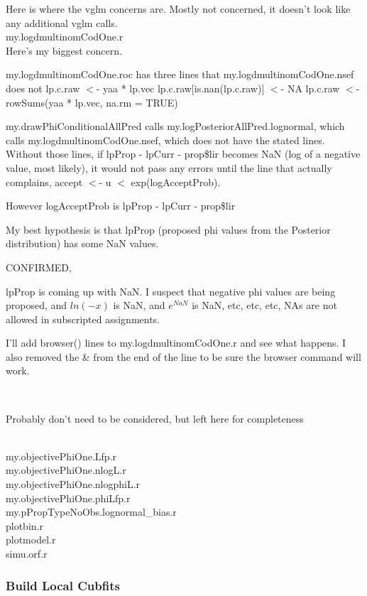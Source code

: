 \documentclass[11pt]{article} %
\begin{document}
Here is where the vglm concerns are. Mostly not concerned, it doesn't look like any additional vglm calls.\\


my.logdmultinomCodOne.r\\

Here's my biggest concern. 


my.logdmultinomCodOne.roc has three lines that my.logdmultinomCodOne.nsef does not
  lp.c.raw $<$- yaa * lp.vec
  lp.c.raw[is.nan(lp.c.raw)] $<$- NA
  lp.c.raw $<$- rowSums(yaa * lp.vec, na.rm = TRUE)

my.drawPhiConditionalAllPred calls my.logPosteriorAllPred.lognormal, which calls my.logdmultinomCodOne.nsef, which does not have the stated lines. Without those lines, if lpProp - lpCurr - prop\$lir becomes NaN (log of a negative value, most likely), it would not pass any errors until the line that actually complains, accept $<$- u $<$ exp(logAcceptProb).

However logAcceptProb is lpProp - lpCurr - prop\$lir

My best hypothesis is that lpProp (proposed phi values from the Posterior distribution) has some NaN values.


CONFIRMED, 



lpProp is coming up with NaN. I suspect that negative phi values are being proposed, and $ln(-x)$ is NaN, and $e^{NaN}$ is NaN, etc, etc, etc, NAs are not allowed in subscripted assignments.

I'll add browser() lines to my.logdmultinomCodOne.r and see what happens. I also removed the \& from the end of the line to be sure the browser command will work.


~


Probably don't need to be considered, but left here for completeness

~\\
my.objectivePhiOne.Lfp.r\\
my.objectivePhiOne.nlogL.r\\
my.objectivePhiOne.nlogphiL.r\\
my.objectivePhiOne.phiLfp.r\\
my.pPropTypeNoObs.lognormal\_bias.r\\
plotbin.r\\
plotmodel.r\\
simu.orf.r\\


\subsubsection{Build Local Cubfits}
\end{document}
